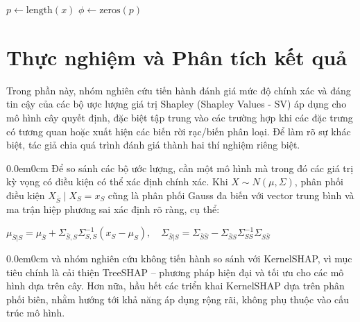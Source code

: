 \documentclass[12pt, a4paper]{article}
\theoremstyle{plain}
\theoremstyle{proposition}
\theoremstyle{lemma}
\begin{document}
\begin{algorithm}[H]
\caption{Multi-Games Algorithm}
\KwOut{$\phi$}

$p \gets \text{length}(x)$\;
$\phi \gets \text{zeros}(p)$\;


\Return{$\phi$}
\end{algorithm}

\section{Thực nghiệm và Phân tích kết quả}

Trong phần này, nhóm nghiên cứu tiến hành đánh giá mức độ chính xác và đáng tin cậy của các bộ ược lượng giá trị Shapley (Shapley Values - SV) áp dụng cho mô hình cây quyết định, đặc biệt tập trung vào các trường hợp khi các đặc trưng có tương quan hoặc xuất hiện các biến rời rạc/biến phân loại. Để làm rõ sự khác biệt, tác giả chia quá trình đánh giá thành hai thí nghiệm riêng biệt.

\begin{adjustwidth}{0.0em}{0cm}
Để so sánh các bộ ước lượng, cần một mô hình mà trong đó các giá trị kỳ vọng có điều kiện có thể xác định chính xác. Khi $X \sim N(\mu, \Sigma)$, phân phối điều kiện $X_{\bar{S}} \mid X_S = x_S$ cũng là phân phối Gauss đa biến với vector trung bình và ma trận hiệp phương sai xác định rõ ràng, cụ thể:
\end{adjustwidth}

$\mu_{\bar{S}|S} = \mu_{\bar{S}} + \Sigma_{\bar{S},S} \Sigma_{S,S}^{-1} (x_S - \mu_S), \quad
\Sigma_{\bar{S}|S} = \Sigma_{\bar{S}\bar{S}} - \Sigma_{\bar{S}S} \Sigma_{SS}^{-1} \Sigma_{S\bar{S}}$

\begin{adjustwidth}{0.0em}{0cm}
và nhóm nghiên cứu không tiến hành so sánh với KernelSHAP, vì mục tiêu chính là cải thiện TreeSHAP – phương pháp hiện đại và tối ưu cho các mô hình dựa trên cây. Hơn nữa, hầu hết các triển khai KernelSHAP dựa trên phân phối biên, nhằm hướng tới khả năng áp dụng rộng rãi, không phụ thuộc vào cấu trúc mô hình.  
\end{adjustwidth}
\end{document}
